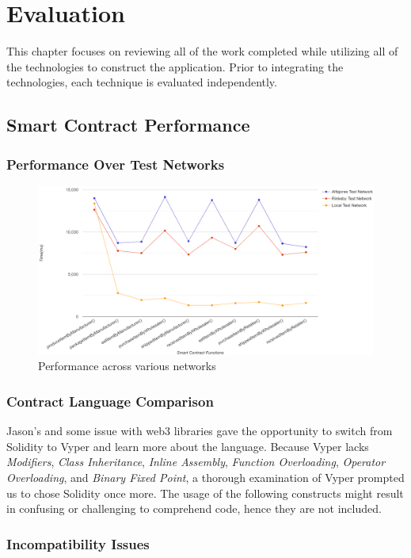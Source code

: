 \chapter{Evaluation}
This chapter focuses on reviewing all of the work completed while utilizing all of the technologies to construct the application. Prior to integrating the technologies, each technique is evaluated independently.

\section{Smart Contract Performance }

\subsection{Performance Over Test Networks}

\begin{figure}[h]
\centering
  \includegraphics[width=15cm]{includes/figures/graph.png} 
  \caption{Performance across various networks}
  \label{Testing on networks}
\end{figure}

\subsection{Contract Language Comparison}

Jason's and some issue with web3 libraries gave the opportunity to switch from Solidity to Vyper and learn more about the language. Because Vyper lacks \textit{Modifiers}, \textit{Class Inheritance}, \textit{Inline Assembly}, \textit{Function Overloading}, \textit{Operator Overloading}, and \textit{Binary Fixed Point}, a thorough examination of Vyper prompted us to chose Solidity once more. The usage of the following constructs might result in confusing or challenging to comprehend code, hence they are not included.

\subsection{Incompatibility Issues}